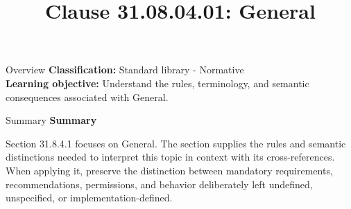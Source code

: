 \documentclass[10pt,letterpaper]{article}
\title{Clause 31.08.04.01: General}
\author{}
\date{}
\begin{document}
\maketitle
\begin{CornellOverviewBox}{Overview}
\textbf{Classification:} Standard library - Normative\\[2pt]
\textbf{Learning objective:} Understand the rules, terminology, and semantic consequences associated with General.
\end{CornellOverviewBox}\begin{CornellSummaryBox}{Summary}
{\sffamily\bfseries\color{Accent} Summary}\par\vspace{3pt}Section 31.8.4.1 focuses on General. The section supplies the rules and semantic distinctions needed to interpret this topic in context with its cross-references. When applying it, preserve the distinction between mandatory requirements, recommendations, permissions, and behavior deliberately left undefined, unspecified, or implementation-defined.
\end{CornellSummaryBox}
\end{document}
